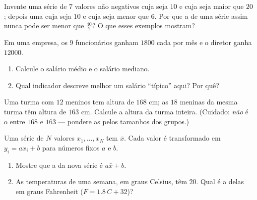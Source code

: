 \begin{exercise}[$\star\star$]\label{exo:g10:stats:6}
Invente uma série de $7$ valores não negativos cuja  seja $10$ e
cuja  seja maior que $20$; depois uma cuja  seja $10$ e cuja
 seja menor que $6$. Por que a  de uma série assim nunca pode
ser menor que $\frac{40}{7}$? O que esses exemplos mostram?
\end{exercise}

\begin{exercise}[$\star\star$]\label{exo:g10:stats:7}
Em uma empresa, os $9$ funcionários ganham $1800$ cada por mês e o
diretor ganha $12000$.
\begin{enumerate}
  \item Calcule o salário médio e o salário mediano.
  \item Qual indicador descreve melhor um salário ``típico'' aqui? Por
        quê?
\end{enumerate}
\end{exercise}

\begin{exercise}[$\star\star$]\label{exo:g10:stats:8}
Uma turma com $12$ meninos tem altura  de $168$ cm; as $18$ meninas
da mesma turma têm altura  de $163$ cm. Calcule a altura  da
turma inteira. (Cuidado: \emph{não} é o  entre $168$ e $163$
--- pondere as  pelos tamanhos dos grupos.)
\end{exercise}

\begin{exercise}[$\star\star\star$]\label{exo:g10:stats:9}
Uma série de $N$ valores $x_1, \dots, x_N$ tem  $\bar x$. Cada valor
é transformado em $y_i = a x_i + b$ para números fixos $a$ e $b$.
\begin{enumerate}
  \item Mostre que a  da nova série é $a \bar x + b$.
  \item As temperaturas de uma semana, em graus Celsius, têm  $20$.
        Qual é a  delas em graus Fahrenheit ($F = 1.8\,C + 32$)?
\end{enumerate}
\end{exercise}

